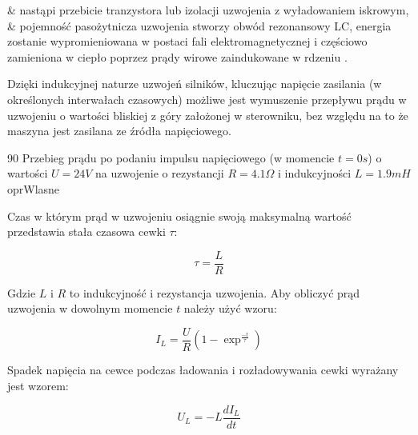 \begin{easylist}
	& nastąpi przebicie tranzystora lub izolacji uzwojenia z wyładowaniem iskrowym,
	& pojemność pasożytnicza uzwojenia stworzy obwód rezonansowy LC, energia zostanie wypromieniowana w postaci fali elektromagnetycznej i częściowo zamieniona w ciepło poprzez prądy wirowe zaindukowane w rdzeniu \cite{przepiorkowski}.
	\\
\end{easylist}

Dzięki indukcyjnej naturze uzwojeń silników, kluczując napięcie zasilania (w określonych interwałach czasowych) możliwe jest wymuszenie przepływu prądu w uzwojeniu o wartości bliskiej z góry założonej w sterowniku, bez względu na to że maszyna jest zasilana ze źródła napięciowego.

	{90}
	{Przebieg prądu po podaniu impulsu napięciowego (w momencie $ t = 0 s $) o wartości $ U = 24 V $ na uzwojenie o rezystancji $ R = 4.1 \Omega $ i indukcyjności $ L = 1.9 mH $}
	{oprWlasne}
	
Czas w którym prąd w uzwojeniu osiągnie swoją maksymalną wartość przedstawia stała czasowa cewki $ \tau $:

\begin{equation} \label{eq:ster1}
	\tau = \frac{L}{R}
\end{equation}

Gdzie $ L $ i $ R $ to indukcyjność i rezystancja uzwojenia. Aby obliczyć prąd uzwojenia w dowolnym momencie $ t $ należy użyć wzoru:

\begin{equation} \label{eq:ster2}
	I_L = \frac{U}{R} (1 - \exp^\frac{-t}{\tau})
\end{equation}

Spadek napięcia na cewce podczas ładowania i rozładowywania cewki wyrażany jest wzorem:

\begin{equation} \label{eq:ster3}
	U_L = - L \frac{dI_L}{dt}
\end{equation}





\clearpage




